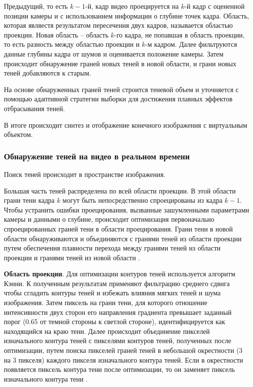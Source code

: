 Предыдущий, то есть $k-1$-й, кадр видео проецируется на $k$-й кадр с оцененной позиции камеры и с использованием информации о глубине точек кадра. Область, которая являестя результатом пересечения двух кадров, называется областью проекции. Новая область -- область $k$-го кадра, не попавшая в область проекции, то есть разность между областью проекции и $k$-м кадром. Далее фильтруются данные глубины кадра от шумов и оценивается положение камеры. Затем происходит обнаружение граней новых теней в новой области, и грани новых теней добавляются к старым. 

На основе обнаруженных граней теней строится теневой объем и уточняется с помощью адаптивной стратегии выборки \cite{THOMASIAN2022385} для достижения плавных эффектов отбрасывания теней.

В итоге происходит синтез и отображение конечного изображения с виртуальным объектом.

\subsubsection*{Обнаружение теней на видео в реальном времени}

Поиск теней происходит в пространстве изображения. 

Большая часть теней распределена по всей области проекции. В этой области грани тени кадра $k$ могут быть непосредственно спроецированы из кадра $k - 1$. Чтобы устранить ошибки проецирования, вызванные зашумленными параметрами камеры и данными о глубине, происходит оптимизация первоначально спроецированных граней тени в области проецирования. Грани тени в новой области обнаруживаются и объединяются с гранями теней из области проекции путем обеспечения плавности перехода между гранями теней из области проекции и гранями теней из новой области \cite{wei2019simulating}.

\textbf{Область проекции}. Для оптимизации контуров теней используется алгоритм Кэнни. К полученным результатам применяют фильтрацию среднего сдвига чтобы сгладить контуры теней и избежать влияния мягких теней и шума изображения. Затем пиксель на грани тени, для которого отношение интенсивности двух сторон его направления градиента превышает заданный порог (0.65 от темной стороны к светлой стороне), идентифицируется как находящийся на краю тени. Далее происходит объединение пикселей изначального контура теней с пикселями контуров теней, полученных после оптимизации, путем поиска пикселей граней теней в небольшой окрестности (3 на 3 пикселя) каждого пикселя изначального контура теней. Если в окрестности появляется пиксель контура тени после оптимизации, то он заменяет пиксель изначального контура тени \cite{wei2019simulating}.

